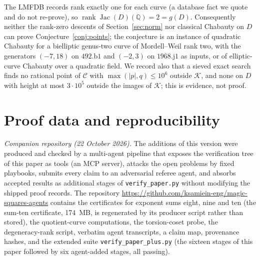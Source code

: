\documentclass[11pt,letterpaper]{article}
\theoremstyle{definition}\newtheorem{definition}[theorem]{Definition}
\theoremstyle{remark}\newtheorem{remark}[theorem]{Remark}
\newcommand{\Q}{\mathbb Q}\newcommand{\Z}{\mathbb Z}\newcommand{\R}{\mathbb R}
\begin{document}
The LMFDB records rank exactly one for each curve (a database fact we quote and do not re-prove), so $\operatorname{rank}\operatorname{Jac}(D)(\Q)=2=g(D)$. Consequently neither the rank-zero descents of Section~\ref{sec:norm} nor classical Chabauty on $D$ can prove Conjecture~\ref{conj:points}; the conjecture is an instance of quadratic Chabauty for a bielliptic genus-two curve of Mordell--Weil rank two, with the generators $(-7,18)$ on $492.\mathrm{b}1$ and $(-2,3)$ on $1968.\mathrm{j}1$ as inputs, or of elliptic-curve Chabauty over a quadratic field. We record also that a sieved exact search finds no rational point of $\mathcal C$ with $\max(|p|,q)\le10^6$ outside $\mathcal K$, and none on $D$ with height at most $3\cdot10^5$ outside the images of $\mathcal K$; this is evidence, not proof.



\section{Proof data and reproducibility}\label{sec:repro}
\emph{Companion repository (22 October 2026).} The additions of this version were produced and checked by a multi-agent pipeline that exposes the verification tree of this paper as tools (an MCP server), attacks the open problems by fixed playbooks, submits every claim to an adversarial referee agent, and absorbs accepted results as additional stages of \texttt{verify\_paper.py} without modifying the shipped proof records. The repository \url{https://github.com/ksamiein-eng/magic-squares-agents} contains the certificates for exponent sums eight, nine and ten (the sum-ten certificate, 174~MB, is regenerated by its producer script rather than stored), the quotient-curve computations, the torsion-coset probe, the degeneracy-rank script, verbatim agent transcripts, a claim map, provenance hashes, and the extended suite \texttt{verify\_paper\_plus.py} (the sixteen stages of this paper followed by six agent-added stages, all passing).
\end{document}
